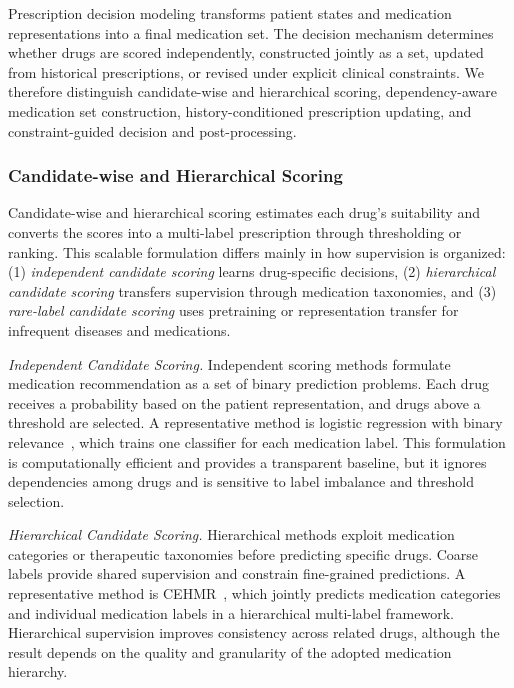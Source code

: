 \documentclass[manuscript,review]{acmart}
\begin{document}
Prescription decision modeling transforms patient states and medication representations into a final medication set. The decision mechanism determines whether drugs are scored independently, constructed jointly as a set, updated from historical prescriptions, or revised under explicit clinical constraints. We therefore distinguish candidate-wise and hierarchical scoring, dependency-aware medication set construction, history-conditioned prescription updating, and constraint-guided decision and post-processing.

\subsubsection{Candidate-wise and Hierarchical Scoring}

Candidate-wise and hierarchical scoring estimates each drug’s suitability and converts the scores into a multi-label prescription through thresholding or ranking. This scalable formulation differs mainly in how supervision is organized: (1) \textit{independent candidate scoring} learns drug-specific decisions, (2) \textit{hierarchical candidate scoring} transfers supervision through medication taxonomies, and (3) \textit{rare-label candidate scoring} uses pretraining or representation transfer for infrequent diseases and medications.

\textit{Independent Candidate Scoring.} Independent scoring methods formulate medication recommendation as a set of binary prediction problems. Each drug receives a probability based on the patient representation, and drugs above a threshold are selected. A representative method is logistic regression with binary relevance~\cite{luaces2012binary}, which trains one classifier for each medication label. This formulation is computationally efficient and provides a transparent baseline, but it ignores dependencies among drugs and is sensitive to label imbalance and threshold selection.

\textit{Hierarchical Candidate Scoring.} Hierarchical methods exploit medication categories or therapeutic taxonomies before predicting specific drugs. Coarse labels provide shared supervision and constrain fine-grained predictions. A representative method is CEHMR~\cite{wang2023cehmr}, which jointly predicts medication categories and individual medication labels in a hierarchical multi-label framework. Hierarchical supervision improves consistency across related drugs, although the result depends on the quality and granularity of the adopted medication hierarchy.
\end{document}
